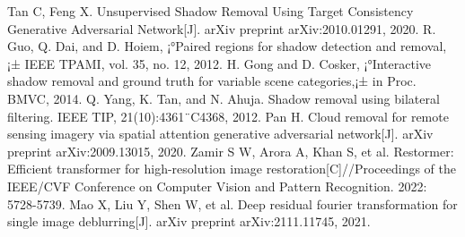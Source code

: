 \documentclass[journal]{IEEEtran}
\begin{document}
\begin{thebibliography}{99}
Tan C, Feng X. Unsupervised Shadow Removal Using Target Consistency Generative Adversarial Network[J]. arXiv preprint arXiv:2010.01291, 2020.
R. Guo, Q. Dai, and D. Hoiem, ¡°Paired regions for shadow detection and removal,¡± IEEE TPAMI, vol. 35, no. 12, 2012.
H. Gong and D. Cosker, ¡°Interactive shadow removal and ground truth for variable scene categories,¡± in Proc. BMVC, 2014.
Q. Yang, K. Tan, and N. Ahuja. Shadow removal using bilateral filtering. IEEE TIP, 21(10):4361¨C4368, 2012.
Pan H. Cloud removal for remote sensing imagery via spatial attention generative adversarial network[J]. arXiv preprint arXiv:2009.13015, 2020.
Zamir S W, Arora A, Khan S, et al. Restormer: Efficient transformer for high-resolution image restoration[C]//Proceedings of the IEEE/CVF Conference on Computer Vision and Pattern Recognition. 2022: 5728-5739.
Mao X, Liu Y, Shen W, et al. Deep residual fourier transformation for single image deblurring[J]. arXiv preprint arXiv:2111.11745, 2021.

\end{thebibliography}
\end{document}
